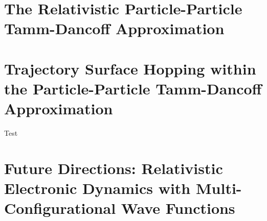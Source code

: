 \documentclass[12pt]{article}
\begin{document}
\section{The Relativistic Particle-Particle Tamm-Dancoff Approximation}
\label{sec:pp-X2C}


\section{Trajectory Surface Hopping within the Particle-Particle Tamm-Dancoff Approximation}
\label{sec:pp-TSH}
Test\cite{DBWY16_JCTC935,DBWY16_Accepted1,DBWY16_Submitted1,DBWY16_Submitted2}

\section{Future Directions: Relativistic Electronic Dynamics with Multi-Configurational Wave Functions}
\label{sec:Future}


\end{document}
